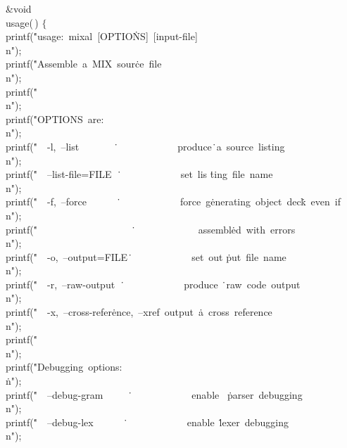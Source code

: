\Y\B\&{void} \\{usage}(\,)\1\1\2\2\6
${}\{{}$\1\6
\\{printf}(\.{"usage:\ mixal\ [OPTIO}\)\.{NS]\ [input-file]\\n"});\6
\\{printf}(\.{"Assemble\ a\ MIX\ sour}\)\.{ce\ file\\n"});\6
\\{printf}(\.{"\\n"});\6
\\{printf}(\.{"OPTIONS\ are:\\n"});\6
\\{printf}(\.{"\ \ -l,\ --list\ \ \ \ \ \ \ }\)\.{\ \ \ \ \ \ \ \ \ \ \ \ \
produce}\)\.{\ a\ source\ listing\\n"});\6
\\{printf}(\.{"\ \ --list-file=FILE\ }\)\.{\ \ \ \ \ \ \ \ \ \ \ \ \ set\ lis}%
\)\.{ting\ file\ name\\n"});\6
\\{printf}(\.{"\ \ -f,\ --force\ \ \ \ \ \ }\)\.{\ \ \ \ \ \ \ \ \ \ \ \ \
force\ g}\)\.{enerating\ object\ dec}\)\.{k\ even\ if\\n"});\6
\\{printf}(\.{"\ \ \ \ \ \ \ \ \ \ \ \ \ \ \ \ \ \ \ }\)\.{\ \ \ \ \ \ \ \ \ \ %
\ \ \ assembl}\)\.{ed\ with\ errors\\n"});\6
\\{printf}(\.{"\ \ -o,\ --output=FILE}\)\.{\ \ \ \ \ \ \ \ \ \ \ \ \ set\ out}%
\)\.{put\ file\ name\\n"});\6
\\{printf}(\.{"\ \ -r,\ --raw-output\ }\)\.{\ \ \ \ \ \ \ \ \ \ \ \ \ produce}%
\)\.{\ raw\ code\ output\\n"});\6
\\{printf}(\.{"\ \ -x,\ --cross-refer}\)\.{ence,\ --xref\ output\ }\)\.{a\
cross\ reference\\n"});\6
\\{printf}(\.{"\\n"});\6
\\{printf}(\.{"Debugging\ options:\\}\)\.{n"});\6
\\{printf}(\.{"\ \ --debug-gram\ \ \ \ \ }\)\.{\ \ \ \ \ \ \ \ \ \ \ \ \ enable%
\ }\)\.{parser\ debugging\\n"});\6
\\{printf}(\.{"\ \ --debug-lex\ \ \ \ \ \ }\)\.{\ \ \ \ \ \ \ \ \ \ \ \ \
enable\ }\)\.{lexer\ debugging\\n"});\6
